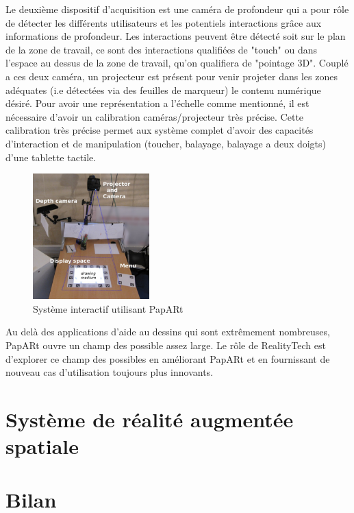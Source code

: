 Le deuxième dispositif d'acquisition est une caméra de profondeur qui a pour rôle de détecter les différents utilisateurs et les potentiels interactions grâce aux informations de profondeur. Les interactions peuvent être détecté soit sur le plan de la zone de travail, ce sont des interactions qualifiées de "touch" ou dans l'espace au dessus de la zone de travail, qu'on qualifiera de "pointage 3D".
Couplé a ces deux caméra, un projecteur est présent pour venir projeter dans les zones adéquates (i.e détectées via des feuilles de marqueur) le contenu numérique désiré. Pour avoir une représentation a l'échelle comme mentionné, il est nécessaire d'avoir un calibration caméras/projecteur très précise. Cette calibration très précise permet aux système complet d'avoir des capacités d'interaction et de manipulation (toucher, balayage, balayage a deux doigts) d'une tablette tactile.

\begin{figure}[H]
\centering
\includegraphics[width=0.4\textwidth]{images/papart-system}
\caption{Système interactif utilisant PapARt\protect\footnotemark}
\label{fig:papartsystem}
\end{figure}


Au delà des applications d'aide au dessins qui sont extrêmement nombreuses, PapARt ouvre un champ des possible assez large. Le rôle de RealityTech est d'explorer ce champ des possibles en améliorant PapARt et en fournissant de nouveau cas d'utilisation toujours plus innovants.



\section{Système de réalité augmentée spatiale}

\section{Bilan}